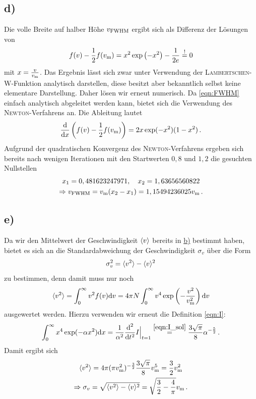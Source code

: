 \documentclass[a4paper, 11pt]{article}
\DeclarePairedDelimiter{\ev}{\langle}{\rangle}
\begin{document}
\subsection*{d)}
Die volle Breite auf halber Höhe $v_\textup{FWHM}$ ergibt sich als Differenz der Lösungen von
\begin{equation}
    f(v) - \frac{1}{2} f(v_\textup{m}) = x^2 \exp\left(-x^2\right) - \frac{1}{2e} \stackrel{\textup{!}}{=} 0
    \label{eqn:FWHM}
\end{equation}
mit $x = \frac{v}{v_\textup{m}}$. Das Ergebnis lässt sich zwar unter Verwendung der \textsc{Lambertschen}-W-Funktion analytisch darstellen, diese besitzt aber bekanntlich selbst keine elementare Darstellung. Daher lösen wir erneut numerisch. Da \eqref{eqn:FWHM} einfach analytisch abgeleitet werden kann, bietet sich die Verwendung des \textsc{Newton}-Verfahrens an. Die Ableitung lautet
\begin{equation}
    \frac{\textup{d}}{\textup{d}x} \left(f(v) - \frac{1}{2} f(v_\textup{m})\right) = 2x \exp(-x^2)(1 - x^2)\,.
\end{equation}
Aufgrund der quadratischen Konvergenz des \textsc{Newton}-Verfahrens ergeben sich bereits nach wenigen Iterationen mit den Startwerten $0,8$ und $1,2$ die gesuchten Nullstellen 
\begin{gather}
    x_1 = 0,481623247971, \quad x_2 = 1,63656560822 \\
    \Rightarrow v_\textup{FWHM} = v_\textup{m} (x_2 - x_1) = 1,15494236025 v_\textup{m} \,.
\end{gather}

\subsection*{e)}
Da wir den Mittelwert der Geschwindigkeit $\ev{v}$ bereits in \hyperref[subsec:b]{b)} bestimmt haben, bietet es sich an die Standardabweichung der Geschwindigkeit $\sigma_v$ über die Form
\begin{equation}
    \sigma_v^2 = \ev{v^2} - \ev{v}^2
\end{equation}
zu bestimmen, denn damit muss nur noch
\begin{equation}
    \ev{v^2} = \int_{0}^{\infty} v^2 f(v) \textup{d}v = 4\pi N \int_{0}^{\infty} v^4 \exp\left(-\frac{v^2}{v_\textup{m}^2}\right) \textup{d}v
\end{equation}
ausgewertet werden. Hierzu verwenden wir erneut die Definition \eqref{eqn:I}: 
\begin{equation}
    \int_{0}^{\infty} x^4 \exp(-\alpha x^2) \textup{d}x = \frac{1}{\alpha^2} \frac{\textup{d}^2}{\textup{d}t^2}I \Big|_{t = 1} \stackrel{\eqref{eqn:I_sol}}{=} \frac{3\sqrt{\pi}}{8}\alpha^{-\frac{5}{2}}\,.
\end{equation}
Damit ergibt sich
\begin{gather}
    \ev{v^2} = 4\pi (\pi v_\textup{m}^2)^{-\frac{3}{2}} \frac{3\sqrt{\pi}}{8} v_\textup{m}^5 = \frac{3}{2}v_\textup{m}^2 \\
    \Rightarrow \sigma_v = \sqrt{\ev{v^2} - \ev{v}^2} = \sqrt{\frac{3}{2}  - \frac{4}{\pi}} v_\textup{m} \,.
\end{gather}
\end{document}
